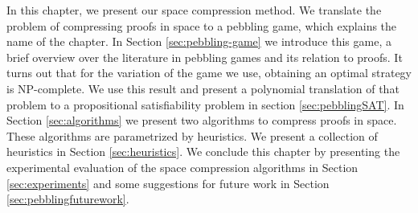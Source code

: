
In this chapter, we present our space compression method.
We translate the problem of compressing proofs in space to a pebbling game, which explains the name of the chapter.
In Section \ref{sec:pebbling-game} we introduce this game, a brief overview over the literature in pebbling games and its relation to proofs.
It turns out that for the variation of the game we use, obtaining an optimal strategy is NP-complete.
We use this result and present a polynomial translation of that problem to a propositional satisfiability problem in section \ref{sec:pebblingSAT}.
In Section \ref{sec:algorithms} we present two algorithms to compress proofs in space.
These algorithms are parametrized by heuristics.
We present a collection of heuristics in Section \ref{sec:heuristics}.
We conclude this chapter by presenting the experimental evaluation of the space compression algorithms in Section \ref{sec:experiments} and some suggestions for future work in Section \ref{sec:pebblingfuturework}.


%


%


